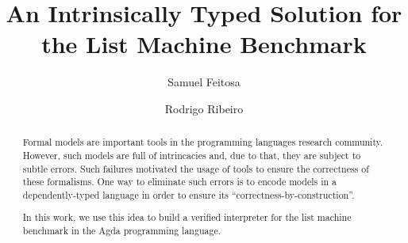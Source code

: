 \documentclass[sigconf]{acmart}
\theoremstyle{definition}
\begin{document}



\title{An Intrinsically Typed Solution for the List Machine Benchmark}

\author{Samuel Feitosa}
\authornotemark[1]

\author{Rodrigo Ribeiro}





\begin{abstract}
Formal models are important tools in the programming languages research
community. However, such models are full of intrincacies and, due to that,
they are subject to subtle errors. Such failures motivated the usage of
tools to ensure the correctness of these formalisms. One way to eliminate
such errors is to encode models in a dependently-typed language in order
to ensure its ``correctness-by-construction''.

In this work, we use this idea to build a verified interpreter
for the list machine benchmark in the Agda programming language.
\end{abstract}


\end{document}
